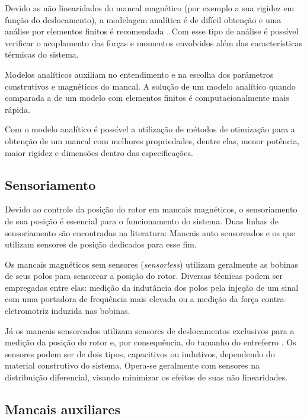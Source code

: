 Devido as não linearidades do mancal magnético (por exemplo a sua rigidez em função do deslocamento), a modelagem analítica é de difícil obtenção e uma análise por elementos finitos é recomendada \citep{pilat2007automatic}. Com esse tipo de análise é possível verificar o acoplamento das forças e momentos envolvidos além das características térmicas do sistema.

Modelos analíticos \citep{Tezuka2013, Chiba} auxiliam no entendimento e na escolha dos parâmetros construtivos e magnéticos do mancal. A solução de um modelo analítico quando comparada a de um modelo com elementos finitos é computacionalmente mais rápida.

Com o modelo analítico é possível a utilização de métodos de otimização \citep{Wu2009, Fang2014} para a obtenção de um mancal com melhores propriedades, dentre elas, menor potência, maior rigidez e dimensões dentro das especificações. 

\subsection{Sensoriamento}

Devido ao controle da posição do rotor em mancais magnéticos, o sensoriamento de sua posição é essencial para o funcionamento do sistema. Duas linhas de sensoriamento são encontradas na literatura: Mancais auto sensoreados \citep{Vischer1993} e os que utilizam sensores de posição dedicados para esse fim.

Os mancais magnéticos sem sensores (\textit{sensorless}) utilizam geralmente as bobinas de seus polos para sensorear a posição do rotor. Diversas técnicas podem ser empregadas \citep{Hofer2009a, Mukhopadhyay2005} entre elas: medição da indutância dos polos pela injeção de um sinal com uma portadora de frequência mais elevada ou a medição da força contra-eletromotriz induzida nas bobinas.
 
Já os mancais sensoreados utilizam sensores de deslocamentos exclusivos para a medição da posição do rotor e, por consequência, do tamanho do entreferro \cite{boehm1993sensors}. Os sensores podem ser de dois tipos, capacitivos ou indutivos, dependendo do material construtivo do sistema. Opera-se geralmente com sensores na distribuição diferencial, visando minimizar os efeitos de suas não linearidades.
 
\subsection{Mancais auxiliares}

